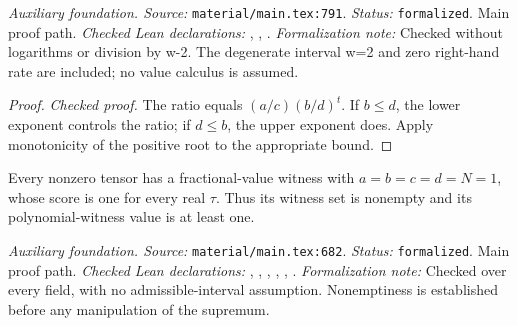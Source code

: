 \noindent\textit{Auxiliary foundation. Source:} \texttt{material/main.tex:791}.
\textit{Status:} \texttt{formalized}. Main proof path.
\textit{Checked Lean declarations:} , , .
\textit{Formalization note:} Checked without logarithms or division by w-2. The degenerate interval w=2 and zero right-hand rate are included; no value calculus is assumed.

\begin{proof}
\leanok
\textit{Checked proof.} The ratio equals $(a/c)(b/d)^t$. If $b\le d$, the lower exponent controls the ratio; if $d\le b$, the upper exponent does. Apply monotonicity of the positive root to the appropriate bound.
\end{proof}

\renewcommand{\thetheorem}{A56}
\begin{lemma}
\label{aux:unit-value-witness}
\leanok
Every nonzero tensor has a fractional-value witness with $a=b=c=d=N=1$, whose score is one for every real $\tau$. Thus its witness set is nonempty and its polynomial-witness value is at least one.
\end{lemma}

\noindent\textit{Auxiliary foundation. Source:} \texttt{material/main.tex:682}.
\textit{Status:} \texttt{formalized}. Main proof path.
\textit{Checked Lean declarations:} , , , , , .
\textit{Formalization note:} Checked over every field, with no admissible-interval assumption. Nonemptiness is established before any manipulation of the supremum.

